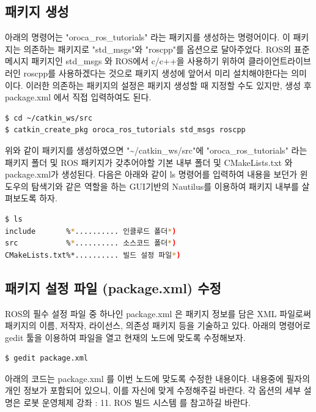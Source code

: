 \subsection{패키지 생성}

아래의 명령어는 "oroca\_ros\_tutorials" 라는 패키지를 생성하는 명령어이다. 이 패키지는 의존하는 패키지로 "std\_msgs"와 "roscpp"를 옵션으로 달아주었다. ROS의 표준 메시지 패키지인 std\_msgs 와 ROS에서 c/c++을 사용하기 위하여 클라이언트라이브러인 roscpp를 사용하겠다는 것으로 패키지 생성에 앞어서 미리 설치해야한다는 의미이다. 이러한 의존하는 패키지의 설정은 패키지 생성할 때 지정할 수도 있지만, 생성 후 package.xml 에서 직접 입력하여도 된다.

\begin{lstlisting}[language=ROS]
$ cd ~/catkin_ws/src
$ catkin_create_pkg oroca_ros_tutorials std_msgs roscpp
\end{lstlisting}

위와 같이 패키지를 생성하였으면 "\textasciitilde/catkin\_ws/src"에 "oroca\_ros\_tutorials" 라는 패키지 폴더 및 ROS 패키지가 갖추어야할 기본 내부 폴더 및 CMakeLists.txt 와 package.xml가 생성된다. 다음은 아래와 같이 ls 명령어를 입력하여 내용을 보던가 윈도우의 탐색기와 같은 역할을 하는 GUI기반의 Nautilus를 이용하여 패키지 내부를 살펴보도록 하자.

\begin{lstlisting}[language=bash]
$ ls
include       %*.......... 인클루드 폴더*)
src           %*.......... 소스코드 폴더*)
CMakeLists.txt%*.......... 빌드 설정 파일*)
\end{lstlisting}

\subsection{패키지 설정 파일 (package.xml) 수정}

ROS의 필수 설정 파일 중 하나인 package.xml 은 패키지 정보를 담은 XML 파일로써 패키지의 이름, 저작자, 라이선스, 의존성 패키지 등을 기술하고 있다. 아래의 명령어로 gedit 툴을 이용하여 파일을 열고 현재의 노드에 맞도록 수정해보자.

\begin{lstlisting}[language=bash]
$ gedit package.xml 
\end{lstlisting}

아래의 코드는 package.xml 를 이번 노드에 맞도록 수정한 내용이다. 내용중에 필자의 개인 정보가 포함되어 있으니, 이를 자신에 맞게 수정해주길 바란다. 각 옵션의 세부 설명은 로봇 운영체제 강좌 : 11. ROS 빌드 시스템 를 참고하길 바란다.

